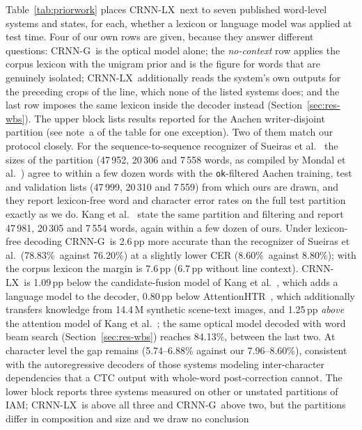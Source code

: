 \documentclass{ws-ijprai}
\newcommand{\ours}{CRNN-LX}            %
\newcommand{\oursnolm}{CRNN-G}         %
\newcommand{\rawwa}{78.83\%}
\newcommand{\rawcer}{8.60\%}
\begin{document}
Table~\ref{tab:priorwork} places \ours\ next to seven published
word-level systems and states, for each, whether a lexicon or language
model was applied at test time. Four of our own rows are given,
because they answer different questions: \oursnolm\ is the optical
model alone; the \emph{no-context} row applies the corpus lexicon
with the unigram prior and is the figure for words that are genuinely
isolated; \ours\ additionally reads the system's own outputs for
the preceding crops of the line, which none of the listed systems
does; and the last row imposes the same lexicon inside the decoder
instead (Section~\ref{sec:res-wbs}). The upper block lists results reported
for the Aachen writer-disjoint partition (see note~a of the table for one
exception). Two of them match our protocol closely. For the
sequence-to-sequence recognizer of Sueiras et
al.~\cite{sueiras2018offline} the sizes of the partition
(47\,952, 20\,306 and 7\,558 words, as compiled by Mondal et
al.~\cite{mondal2022yolo}) agree to within a few dozen words with the
\texttt{ok}-filtered Aachen training, test and validation lists
(47\,999, 20\,310 and 7\,559) from which ours are drawn, and they report lexicon-free word and character
error rates on the full test partition exactly as we do. Kang et
al.~\cite{kang2018convolve} state the same partition and filtering and report
47\,981, 20\,305 and 7\,554 words, again within a few dozen of ours. Under
lexicon-free decoding \oursnolm\ is 2.6\,pp more accurate than the recognizer
of Sueiras et al.\ (\rawwa\ against 76.20\%) at a slightly lower CER (\rawcer\ against 8.80\%);
with the corpus lexicon the margin is
7.6\,pp (6.7\,pp
without line context). \ours\ is
1.09\,pp below the candidate-fusion model of Kang et
al.~\cite{kang2021candidate}, which adds a language model to the decoder,
0.80\,pp below
AttentionHTR~\cite{kass2022attentionhtr}, which additionally transfers
knowledge from 14.4\,M synthetic scene-text images, and 1.25\,pp
\emph{above} the attention model of Kang et al.~\cite{kang2018convolve};
the same optical model decoded with word beam search
(Section~\ref{sec:res-wbs}) reaches 84.13\%, between the last two. At
character level the gap remains
(5.74--6.88\% against our 7.96--\rawcer), consistent with the
autoregressive decoders of those systems modeling inter-character
dependencies that a CTC output with whole-word post-correction cannot.
The lower block reports three systems measured on other or unstated
partitions of IAM; \ours\ is above all three and \oursnolm\ above two, but the
partitions differ in composition and size and we draw no conclusion
\end{document}
